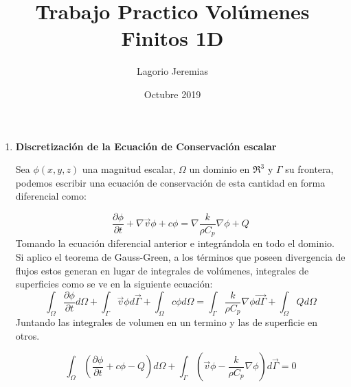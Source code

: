 \documentclass{article}
\title{Trabajo Practico Volúmenes Finitos 1D}
\author{Lagorio Jeremias }
\date{ Octubre 2019}
\begin{document}
\maketitle

\begin{enumerate}
\item 
    \textbf{Discretización de la Ecuación de Conservación escalar }

    Sea $\phi(x,y,z)$ una magnitud escalar, $\Omega$ un dominio en $\mathfrak{R}^3$ y $\Gamma$ su frontera, podemos escribir una ecuación de conservación de esta cantidad en forma diferencial como: 

    \begin{equation}
        \dfrac {{ \partial \phi}} {{ \partial t}} + \nabla \vec{v}\phi+c\phi = \nabla  \frac{k}{\rho C_p} \nabla \phi + Q
        \end{equation}
    Tomando la ecuación diferencial anterior e integrándola en todo el dominio. Si aplico el teorema de Gauss-Green, a los términos que poseen divergencia de flujos estos generan en lugar de integrales de volúmenes, integrales de superficies como se ve en la siguiente ecuación:
    \begin{equation}
       \int_{\Omega} \dfrac {{ \partial \phi}} {{ \partial t}} d\Omega + \int_{\Gamma} \vec{v}\phi d\vec{\Gamma} + \int_{\Omega} c \phi d\Omega = \int_{\Gamma}  \frac{k}{\rho C_p} \nabla \phi \vec{d\Gamma} + \int_{\Omega} Q d\Omega
    \end{equation}
    Juntando las integrales de volumen en un termino y las de superficie en otros.\
    
   \begin{equation}
       \int_{\Omega} (\dfrac {{ \partial \phi}} {{ \partial t}} + c \phi - Q ) d\Omega + \int_{\Gamma} (\vec{v}\phi - \frac{k}{\rho C_p} \nabla \phi) d\vec{\Gamma} = 0
   \end{equation} 
   

\end{enumerate}
\end{document}
